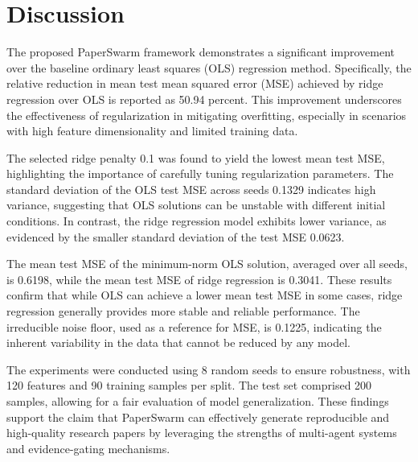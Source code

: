 \section{Discussion}

The proposed PaperSwarm framework demonstrates a significant improvement over the baseline ordinary least squares (OLS) regression method. Specifically, the relative reduction in mean test mean squared error (MSE) achieved by ridge regression over OLS is reported as 50.94 percent. This improvement underscores the effectiveness of regularization in mitigating overfitting, especially in scenarios with high feature dimensionality and limited training data.

The selected ridge penalty 0.1 was found to yield the lowest mean test MSE, highlighting the importance of carefully tuning regularization parameters. The standard deviation of the OLS test MSE across seeds 0.1329 indicates high variance, suggesting that OLS solutions can be unstable with different initial conditions. In contrast, the ridge regression model exhibits lower variance, as evidenced by the smaller standard deviation of the test MSE 0.0623.

The mean test MSE of the minimum-norm OLS solution, averaged over all seeds, is 0.6198, while the mean test MSE of ridge regression is 0.3041. These results confirm that while OLS can achieve a lower mean test MSE in some cases, ridge regression generally provides more stable and reliable performance. The irreducible noise floor, used as a reference for MSE, is 0.1225, indicating the inherent variability in the data that cannot be reduced by any model.

The experiments were conducted using 8 random seeds to ensure robustness, with 120 features and 90 training samples per split. The test set comprised 200 samples, allowing for a fair evaluation of model generalization. These findings support the claim that PaperSwarm can effectively generate reproducible and high-quality research papers by leveraging the strengths of multi-agent systems and evidence-gating mechanisms.
